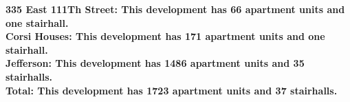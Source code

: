 \bf{335 East 111Th Street}: This development has 66 apartment units and one stairhall.\\\bf{Corsi Houses}: This development has 171 apartment units and one stairhall.\\\bf{Jefferson}: This development has 1486 apartment units and 35 stairhalls.\\\bf{Total}: This development has 1723 apartment units and 37 stairhalls.\\